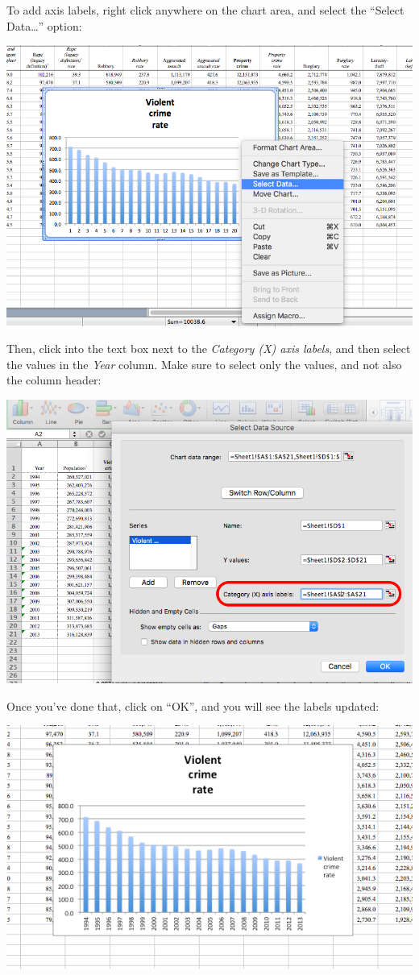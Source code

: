 \documentclass[
]{book}
\begin{document}
To add axis labels, right click anywhere on the chart area, and select the ``Select Data\ldots{}'' option:

\includegraphics{imgs/desc_viz_3.png}

Then, click into the text box next to the \emph{Category (X) axis labels}, and then select the values in the \emph{Year} column. Make sure to select only the values, and not also the column header:

\includegraphics{imgs/desc_viz_4.png}

Once you've done that, click on ``OK'', and you will see the labels updated:

\includegraphics{imgs/desc_viz_5.png}
\end{document}
